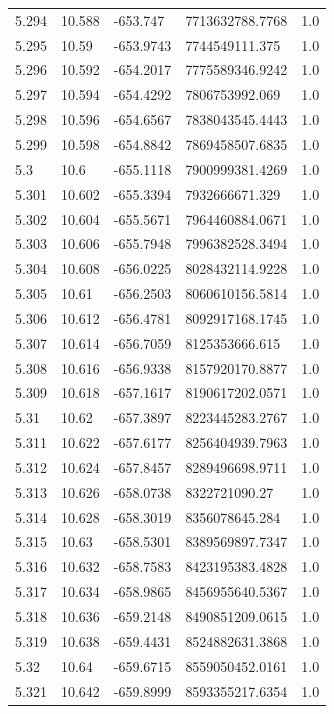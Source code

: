 \begin{tabular}{lllll}
5.294 & 10.588 & -653.747 & 7713632788.7768 & 1.0 \\
5.295 & 10.59 & -653.9743 & 7744549111.375 & 1.0 \\
5.296 & 10.592 & -654.2017 & 7775589346.9242 & 1.0 \\
5.297 & 10.594 & -654.4292 & 7806753992.069 & 1.0 \\
5.298 & 10.596 & -654.6567 & 7838043545.4443 & 1.0 \\
5.299 & 10.598 & -654.8842 & 7869458507.6835 & 1.0 \\
5.3 & 10.6 & -655.1118 & 7900999381.4269 & 1.0 \\
5.301 & 10.602 & -655.3394 & 7932666671.329 & 1.0 \\
5.302 & 10.604 & -655.5671 & 7964460884.0671 & 1.0 \\
5.303 & 10.606 & -655.7948 & 7996382528.3494 & 1.0 \\
5.304 & 10.608 & -656.0225 & 8028432114.9228 & 1.0 \\
5.305 & 10.61 & -656.2503 & 8060610156.5814 & 1.0 \\
5.306 & 10.612 & -656.4781 & 8092917168.1745 & 1.0 \\
5.307 & 10.614 & -656.7059 & 8125353666.615 & 1.0 \\
5.308 & 10.616 & -656.9338 & 8157920170.8877 & 1.0 \\
5.309 & 10.618 & -657.1617 & 8190617202.0571 & 1.0 \\
5.31 & 10.62 & -657.3897 & 8223445283.2767 & 1.0 \\
5.311 & 10.622 & -657.6177 & 8256404939.7963 & 1.0 \\
5.312 & 10.624 & -657.8457 & 8289496698.9711 & 1.0 \\
5.313 & 10.626 & -658.0738 & 8322721090.27 & 1.0 \\
5.314 & 10.628 & -658.3019 & 8356078645.284 & 1.0 \\
5.315 & 10.63 & -658.5301 & 8389569897.7347 & 1.0 \\
5.316 & 10.632 & -658.7583 & 8423195383.4828 & 1.0 \\
5.317 & 10.634 & -658.9865 & 8456955640.5367 & 1.0 \\
5.318 & 10.636 & -659.2148 & 8490851209.0615 & 1.0 \\
5.319 & 10.638 & -659.4431 & 8524882631.3868 & 1.0 \\
5.32 & 10.64 & -659.6715 & 8559050452.0161 & 1.0 \\
5.321 & 10.642 & -659.8999 & 8593355217.6354 & 1.0 \\

\end{tabular}
